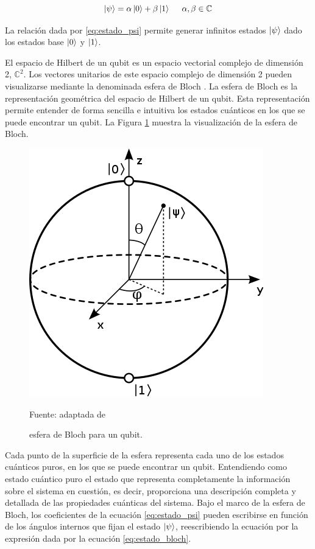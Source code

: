 \begin{equation}
    \ket{\psi} = \alpha\ket{0} + \beta\ket{1} \; \; \; \; \; \alpha, \beta \in \mathbb{C}
    \label{eq:estado_psi}
\end{equation}

La relación dada por \ref{eq:estado_psi} permite generar infinitos estados $\ket{\psi}$ dado los estados base $\ket{0}$ y $\ket{1}$.

\newpage

El espacio de Hilbert \citep{casazza} de un qubit es un espacio vectorial complejo de dimensión 2, $\mathbb{C}^{2}$. Los vectores unitarios de este espacio complejo de dimensión 2 pueden visualizarse mediante la denominada esfera de Bloch \citep{bloch}. La esfera de Bloch es la representación geométrica del espacio de Hilbert de un qubit. Esta representación permite entender de forma sencilla e intuitiva los estados cuánticos en los que se puede encontrar un qubit. La Figura \ref{fig:bloch_sphere} muestra la visualización de la esfera de Bloch.


\begin{figure}[!ht]
    \centering
    \includegraphics[scale = 0.5]{img/03-esfera_bloch.png}
    \caption{esfera de Bloch para un qubit.}
    Fuente: adaptada de \cite{bloch}
    \label{fig:bloch_sphere}
\end{figure}

Cada punto de la superficie de la esfera representa cada uno de los estados cuánticos puros, en los que se puede encontrar un qubit. Entendiendo como estado cuántico puro el estado que representa completamente la información sobre el sistema en cuestión, es decir, proporciona una descripción completa y detallada de las propiedades cuánticas del sistema. Bajo el marco de la esfera de Bloch, los coeficientes de la ecuación \ref{eq:estado_psi} pueden escribirse en función de los ángulos internos que fijan el estado $\ket{\psi}$, reescribiendo la ecuación por la expresión dada por la ecuación \ref{eq:estado_bloch}.


